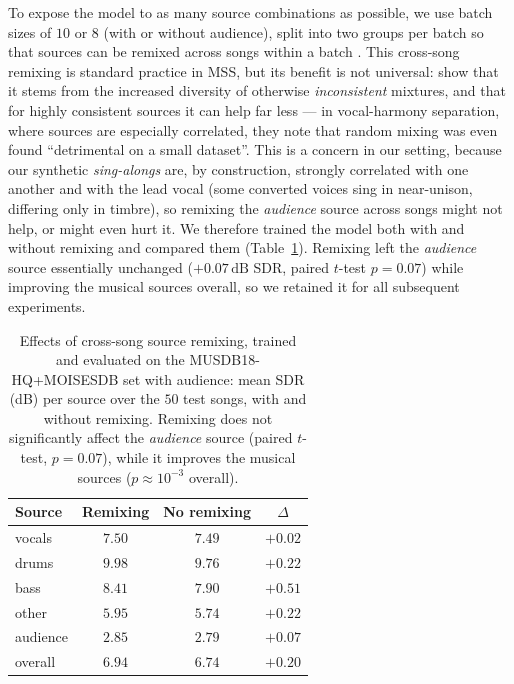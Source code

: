 To expose the model to as many source combinations as possible, we use batch
sizes of $10$ or $8$ (with or without audience), split into two groups per batch
so that sources can be remixed across songs within a batch \citep{jeon2024does}.
This cross-song remixing is standard practice in \acrshort{MSS}, but its benefit
is not universal: \citet{jeon2024does} show that it stems from the increased
diversity of otherwise \emph{inconsistent} mixtures, and that for highly
consistent sources it can help far less --- in vocal-harmony separation, where
sources are especially correlated, they note that random mixing was even found
``detrimental on a small dataset''. This is a concern in our setting,
because our synthetic \emph{sing-alongs} are, by construction, strongly
correlated with one another and with the lead vocal (some converted voices sing
in near-unison, differing only in timbre), so remixing the \emph{audience}
source across songs might not help, or might even hurt it. We therefore trained
the model both with and without remixing and compared them
(Table~\ref{tab:mss_remix}). Remixing left the \emph{audience} source
essentially unchanged ($+0.07\,\text{dB}$ \acrshort{SDR}, paired $t$-test
$p = 0.07$) while improving the musical sources overall, so we retained it for all subsequent experiments.

\begin{table}[htbp]
\centering\footnotesize
\renewcommand{\arraystretch}{1.2}
\caption{Effects of cross-song source remixing, trained and evaluated on the
MUSDB18-HQ+MOISESDB set with audience: mean \acrshort{SDR} (dB) per source
over the $50$ test songs, with and without remixing. Remixing does not
significantly affect the \emph{audience} source (paired $t$-test, $p = 0.07$),
while it improves the musical sources ($p \approx 10^{-3}$ overall).}
\label{tab:mss_remix}
\begin{tabular}{@{}lccc@{}}
\toprule
Source & Remixing & No remixing & $\Delta$ \\
\midrule
vocals   & $7.50$ & $7.49$ & $+0.02$ \\
drums    & $9.98$ & $9.76$ & $+0.22$ \\
bass     & $8.41$ & $7.90$ & $+0.51$ \\
other    & $5.95$ & $5.74$ & $+0.22$ \\
audience & $2.85$ & $2.79$ & $+0.07$ \\
\midrule
overall  & $6.94$ & $6.74$ & $+0.20$ \\
\bottomrule
\end{tabular}
\end{table}


